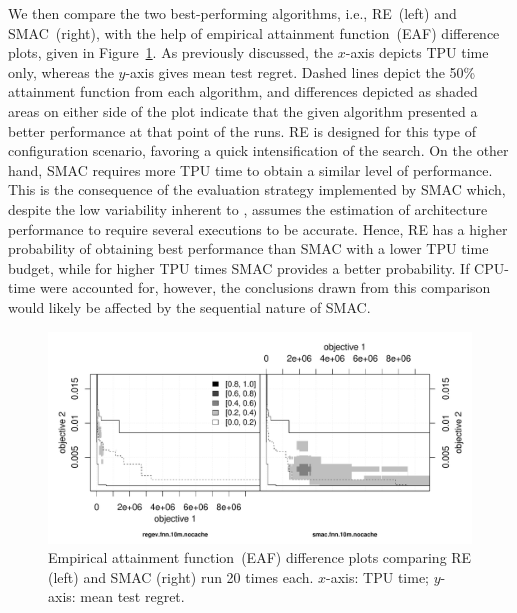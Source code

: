 We then compare the two best-performing algorithms, i.e., RE~(left) and SMAC~(right), with the help of empirical attainment function~(EAF) difference plots, given in Figure~\ref{fig:eaf-original}. As previously discussed, the $x$-axis depicts TPU time only, whereas the $y$-axis gives mean test regret. Dashed lines depict the 50\% attainment function from each algorithm, and differences depicted as shaded areas on either side of the plot indicate that the given algorithm presented a better performance at that point of the runs. 
RE is designed for this type of configuration scenario, favoring a quick intensification of the search. On the other hand, SMAC requires more TPU time to obtain a similar level of performance. This is the consequence of the evaluation strategy implemented by SMAC which, despite the low variability inherent to \nasbench, assumes the estimation of architecture performance to require several executions to be accurate. Hence, RE has a higher probability of obtaining best performance than SMAC with a lower TPU time budget, while for higher TPU times SMAC provides a better probability. If CPU-time were accounted for, however, the conclusions drawn from this comparison would likely be affected by the sequential nature of SMAC.

\begin{figure}[!t]
\centering
\includegraphics[width=\linewidth, clip=true, trim=45px 65px 85px 85px]{imgs/eaf-regev-smac-fnn-nocache.pdf}
\caption{Empirical attainment function~(EAF) difference plots comparing RE (left) and SMAC (right) run 20 times each. $x$-axis: TPU time; $y$-axis: mean test regret. %
}
\label{fig:eaf-original}
\end{figure}

